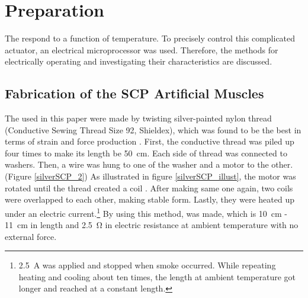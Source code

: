 \section{Preparation}\label{section_preparation}
The \scps respond to a function of temperature. To precisely control this complicated actuator, an electrical microprocessor was used. Therefore, the methods for electrically operating \scps and investigating their characteristics are discussed.

\subsection{Fabrication of the SCP Artificial Muscles}
The \scps used in this paper were made by twisting silver-painted nylon thread (Conductive Sewing Thread Size 92, Shieldex), which was found to be the best in terms of strain and force production \cite{haines}. First, the conductive thread was piled up four times to make its length be \SI{50}{\centi\meter}. Each side of thread was connected to washers. Then, a wire was hung to one of the washer and a motor to the other. (Figure \ref{silverSCP_2})
As illustrated in figure \ref{silverSCP_illust}, the motor was rotated until the thread created a coil \cite{fab_coil}. After making same one again, two coils were overlapped to each other, making stable form. 
Lastly, they were heated up under an electric current.\footnote{\SI{2.5}{\ampere} was applied and stopped when smoke occurred. While repeating heating and cooling about ten times, the length at ambient temperature got longer and reached at a constant length.} By using this method, \scp was made, which is \SI{10}{\centi\meter} - \SI{11}{\centi\meter} in length and \SI{2.5}{\ohm} in electric resistance at ambient temperature with no external force.

